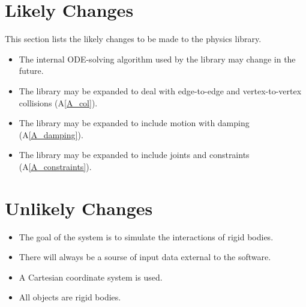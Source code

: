 \documentclass[12pt]{article}
\newcounter{lcnum} %
\newcounter{ucnum} %
\newcommand{\utheucnum}{UC\theucnum}
\begin{document}

%
%

\section{Likely Changes}    
\label{sec_likechan}

This section lists the likely changes to be made to the physics library.

\begin{itemize}
	\item[LC\refstepcounter{lcnum}\thelcnum\label{LC_solver}:] The internal
          ODE-solving algorithm used by the library may change in the
          future. 
	\item[LC\refstepcounter{lcnum}\thelcnum\label{LC_collisions}:] The
          library may be expanded to deal with edge-to-edge and vertex-to-vertex
          collisions (A\ref{A_col}). 
	\item[LC\refstepcounter{lcnum}\thelcnum\label{LC_damping}:] The library
          may be expanded to include motion with damping (A\ref{A_damping}).
	\item[LC\refstepcounter{lcnum}\thelcnum\label{LC_constraints}:] The
          library may be expanded to include joints and constraints
          (A\ref{A_constraints}).
\end{itemize}


% 
%

\section{Unlikely Changes}    
\noindent \begin{itemize}
	
	\item[\refstepcounter{ucnum} \utheucnum \label{ucGoal}:] The goal of the system is to simulate the interactions of rigid bodies.
	\item[\refstepcounter{ucnum} \utheucnum \label{ucInput}:] There will always be a sourse of input data external to the software.
	\item[\refstepcounter{ucnum} \utheucnum \label{ucCordSystem}:] A Cartesian coordinate system is used.
	\item[\refstepcounter{ucnum} \utheucnum \label{ucObjType}:] All objects are rigid bodies.
	
\end{itemize}
\end{document}

